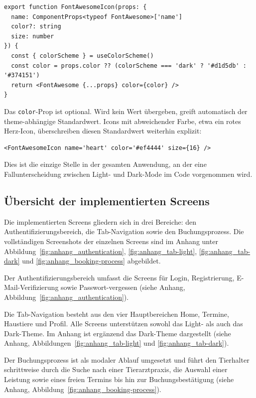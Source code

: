 \begin{listing}[H]
\begin{verbatim}
export function FontAwesomeIcon(props: {
  name: ComponentProps<typeof FontAwesome>['name']
  color?: string
  size: number
}) {
  const { colorScheme } = useColorScheme()
  const color = props.color ?? (colorScheme === 'dark' ? '#d1d5db' : '#374151')
  return <FontAwesome {...props} color={color} />
}
\end{verbatim}
\caption{Zentralisierte Theme-Logik im FontAwesomeIcon-Wrapper}
\label{lst:fontawesome-wrapper}
\end{listing}

Das \texttt{color}-Prop ist optional. Wird kein Wert übergeben, greift automatisch der
theme-abhängige Standardwert. Icons mit abweichender Farbe, etwa ein rotes Herz-Icon,
überschreiben diesen Standardwert weiterhin explizit:

\begin{listing}[H]
\begin{verbatim}
<FontAwesomeIcon name='heart' color='#ef4444' size={16} />
\end{verbatim}
\caption{Explizite Farbangabe bei abweichenden Icon-Farben}
\label{lst:icon-color}
\end{listing}

Dies ist die einzige Stelle in der gesamten Anwendung, an der eine Fallunterscheidung
zwischen Light- und Dark-Mode im Code vorgenommen wird.

\subsection{Übersicht der implementierten Screens}

Die implementierten Screens gliedern sich in drei Bereiche: den Authentifizierungsbereich, die Tab-Navigation sowie den Buchungsprozess. Die vollständigen Screenshots der einzelnen Screens sind im Anhang unter Abbildung~\ref{fig:anhang_authentication}, \ref{fig:anhang_tab-light}, \ref{fig:anhang_tab-dark} und \ref{fig:anhang_booking-process} abgebildet.

Der Authentifizierungsbereich umfasst die Screens für Login, Registrierung, E-Mail-Verifizierung sowie Passwort-vergessen (siehe Anhang, Abbildung~\ref{fig:anhang_authentication}).

Die Tab-Navigation besteht aus den vier Hauptbereichen Home, Termine, Haustiere und Profil. Alle Screens unterstützen sowohl das Light- als auch das Dark-Theme. Im Anhang ist ergänzend das Dark-Theme dargestellt (siehe Anhang, Abbildungen~\ref{fig:anhang_tab-light} und \ref{fig:anhang_tab-dark}).

Der Buchungsprozess ist als modaler Ablauf umgesetzt und führt den Tierhalter schrittweise durch die Suche nach einer Tierarztpraxis, die Auswahl einer Leistung sowie eines freien Termins bis hin zur Buchungsbestätigung (siehe Anhang, Abbildung~\ref{fig:anhang_booking-process}).